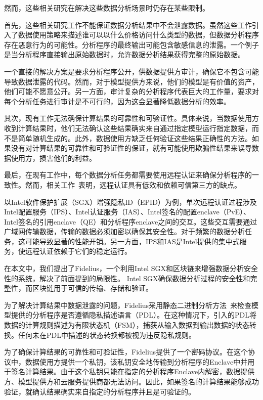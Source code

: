 然而，这些相关研究在解决这些数据分析场景时仍存在某些限制。

首先，这些相关研究工作不能保证数据分析结果中不会泄露数据。虽然这些工作引入了数据使用策略来描述谁可以以什么价格访问什么类型的数据，但数据分析程序存在恶意行为的可能性。分析程序的最终输出可能包含敏感信息的泄露。一个例子是当分析程序直接输出原始数据时，允许数据分析结果获得完整的原始数据。

一个直接的解决方案是要求分析程序公开，供数据提供方审计，确保它不包含可能导致数据泄露的代码。然而，对于模型提供方来说，他们的模型是有价值的资产，他们可能不愿意公开。另一方面，审计复杂的分析程序代表巨大的工作量，要求对每个分析任务进行审计是不可行的，因为这会显著降低数据分析的效率。

其次，现有工作无法确保计算结果的可靠性和可验证性。具体来说，当数据使用方收到计算结果时，他们无法确认这些结果确实来自通过指定模型运行指定数据，而不是简单随机生成的。此外，数据使用方缺乏任何验证这些结果正确性的方法。如果没有对计算结果的可靠性和可验证性的保证，就有可能使用欺骗性结果来误导数据使用方，损害他们的利益。

最后，在现有工作中，每个数据分析任务都需要使用远程认证来确保分析程序的一致性。然而，相关工作~\cite{chen2019opera,chen2022mage}表明，远程认证具有低效和依赖可信第三方的缺点。

以Intel软件保护扩展（SGX）增强隐私ID（EPID）为例，单次远程认证过程涉及Intel配置服务（IPS）、Intel认证服务（IAS）、Intel签名的配置enclave（PvE）、Intel签名的引用enclave（QE）和分析程序enclave之间的交互。这些交互需要通过广域网传输数据，传输的数据必须加密以确保其安全性。对于频繁的数据分析任务，这可能导致显著的性能开销。另一方面，IPS和IAS是Intel提供的集中式服务，使远程认证依赖于它们的稳定运行。

在本文中，我们提出了Fidelius，一个利用Intel SGX和区块链来增强数据分析安全性的系统，解决了前面提到的局限性。
Intel SGX确保数据分析过程的安全性和完整性，而区块链用于可信的传输、存储和验证。

为了解决计算结果中数据泄露的问题，Fidelius采用静态二进制分析方法~\cite{schulte2019gtirb}来检查模型提供的分析程序是否遵循隐私描述语言（PDL）。在这种情况下，引入的PDL将数据的计算规则描述为有限状态机（FSM），捕获从输入数据到输出数据的状态转换。任何未在PDL中描述的状态转换都被视为违反隐私规则。

为了确保计算结果的可靠性和可验证性，Fidelius提供了一个密码协议。在这个协议中，数据使用方提供一个私钥，该私钥安全地传输到分析程序的Enclave中并用于签名计算结果。由于这个私钥只能在指定的分析程序Enclave内解密，数据提供方、模型提供方和云服务提供商都无法访问。因此，如果签名的计算结果能够成功验证，就确认结果确实来自指定的分析程序并且是可验证的。

